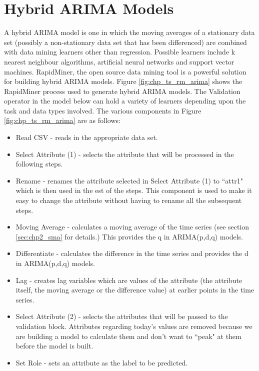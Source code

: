 
\section{Hybrid ARIMA Models}
\label{sec:arima:chp5}
A hybrid ARIMA model is one in which the moving averages of a stationary data set (possibly a non-stationary data set that has been differenced) are combined with data mining learners other than regression. Possible learners include k nearest neighbour algorithms, artificial neural networks and support vector machines.  RapidMiner, the open source data mining tool is a powerful solution for building hybrid ARIMA models. Figure \ref{fig:chp_ts_rm_arima} shows the RapidMiner process used to generate hybrid ARIMA models. The Validation operator in the model below can hold a variety of learners depending upon the task and data types involved. The various components in Figure \ref{fig:chp_ts_rm_arima} are as follows:

\begin{itemize}
\item Read CSV - reads in the appropriate data set.
\item Select Attribute (1) - selects the attribute that will be processed in the following steps.
\item Rename - renames the attribute selected in Select Attribute (1) to \textquotedblleft attr1" which is then used in the est of the steps. This component is used to make it easy to change the attribute without having to rename all the subsequent steps.
\item Moving Average - calculates a moving average of the time series (see section \ref{sec:chp2_sma} for details.) This provides the q in ARIMA(p,d,q) models.
\item Differentiate - calculates the difference in the time series and provides the d in ARIMA(p,d,q) models.
\item Lag - creates lag variables which are values of the attribute (the attribute itself, the moving average or the difference value) at earlier points in the time series.
\item Select Attribute (2) - selects the attributes that will be passed to the validation block. Attributes regarding today's values are removed because we are building a model to calculate them and don't want to \textquotedblleft peak" at them before the model is built.
\item Set Role - sets an attribute as the label to be predicted.

\end{itemize}

